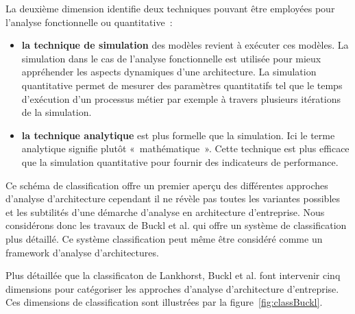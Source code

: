 La deuxième dimension identifie deux techniques pouvant être employées pour l'analyse fonctionnelle ou quantitative~:
	\begin{itemize}
		\item \textbf{la technique de simulation} des modèles revient à exécuter ces modèles. La simulation dans le cas de l'analyse fonctionnelle est utilisée pour mieux appréhender les aspects dynamiques d'une architecture. La simulation quantitative permet de mesurer des paramètres quantitatifs tel que le temps d'exécution d'un processus métier par exemple à travers plusieurs itérations de la simulation. 
		\item \textbf{la technique analytique} est plus formelle que la simulation. Ici le terme analytique signifie plutôt «~mathématique~». Cette technique est plus efficace que la simulation quantitative pour fournir des indicateurs de performance.  
	\end{itemize}
	
Ce schéma de classification offre un premier aperçu des différentes approches d'analyse d'architecture cependant il ne révèle pas toutes les variantes possibles et les subtilités d'une démarche d'analyse en architecture d'entreprise. Nous considérons donc les travaux de Buckl  et al. qui offre un système de classification plus détaillé. Ce système classification peut même être considéré comme un framework d'analyse d'architectures.

Plus détaillée que la classificaton de Lankhorst, Buckl et al. \cite{buckl2009classifying} font intervenir cinq dimensions pour catégoriser les approches d'analyse d'architecture d'entreprise. Ces dimensions de classification sont illustrées par la figure~\ref{fig:classBuckl}.




